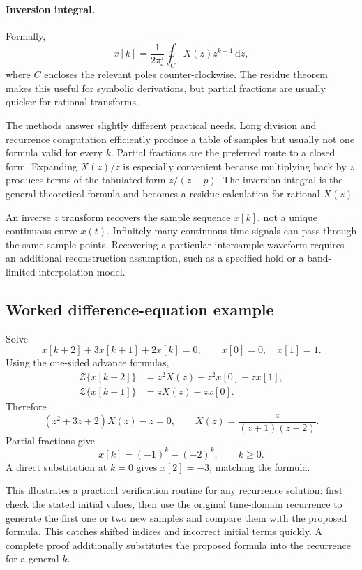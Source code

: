 \documentclass[11pt]{article}
\newcommand{\Z}{\mathcal{Z}}
\newcommand{\dd}{\,\mathrm{d}}
\begin{document}
\paragraph{Inversion integral.} Formally,
\[
x[k]=\frac{1}{2\pi\mathrm{j}}\oint_C X(z)z^{k-1}\dd z,
\]
where $C$ encloses the relevant poles counter-clockwise. The residue theorem makes this useful for symbolic derivations, but partial fractions are usually quicker for rational transforms.

The methods answer slightly different practical needs. Long division and recurrence computation efficiently produce a table of samples but usually not one formula valid for every $k$. Partial fractions are the preferred route to a closed form. Expanding $X(z)/z$ is especially convenient because multiplying back by $z$ produces terms of the tabulated form $z/(z-p)$. The inversion integral is the general theoretical formula and becomes a residue calculation for rational $X(z)$.

An inverse $z$ transform recovers the sample sequence $x[k]$, not a unique continuous curve $x(t)$. Infinitely many continuous-time signals can pass through the same sample points. Recovering a particular intersample waveform requires an additional reconstruction assumption, such as a specified hold or a band-limited interpolation model.

\subsection{Worked difference-equation example}

Solve
\[
x[k+2]+3x[k+1]+2x[k]=0,\qquad x[0]=0,\quad x[1]=1.
\]
Using the one-sided advance formulas,
\begin{align*}
\Z\{x[k+2]\}&=z^2X(z)-z^2x[0]-zx[1],\\
\Z\{x[k+1]\}&=zX(z)-zx[0].
\end{align*}
Therefore
\[
(z^2+3z+2)X(z)-z=0,
\qquad
X(z)=\frac{z}{(z+1)(z+2)}.
\]
Partial fractions give
\[
x[k]=(-1)^k-(-2)^k,\qquad k\ge 0.
\]
A direct substitution at $k=0$ gives $x[2]=-3$, matching the formula.

This illustrates a practical verification routine for any recurrence solution:
first check the stated initial values, then use the original time-domain
recurrence to generate the first one or two new samples and compare them with
the proposed formula. This catches shifted indices and incorrect initial
terms quickly. A complete proof additionally substitutes the proposed formula
into the recurrence for a general $k$.
\end{document}
